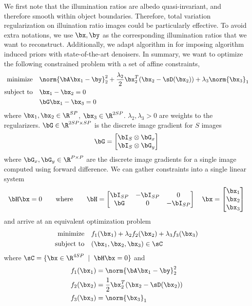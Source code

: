 \documentclass[11pt]{article}
\newcommand{\minimize}{\text{minimize}\quad}
\newcommand{\subjectto}{\text{subject to}\quad}
\begin{document}
$ $\\
We first note that the illumination ratios are albedo quasi-invariant, and therefore smooth within object boundaries. Therefore, total variation regularization on illuination ratio images could be particularly effective. To avoid extra notations, we use $\bx,\by$ as the corresponding illumination ratios that we want to reconstruct. Additionally, we adapt algorithm in \cite{romanoLittleEngineThat2016} for imposing algorithm induced priors with state-of-the-art denoisers. In summary, we want to optimize the following constrained problem with a set of affine constraints,
\begin{align*}
    \minimize  & \norm{\bA\bx_1 - \by}_2^2 + \frac{\lambda_2}{2} \bx_2^T(\bx_2 - \sD(\bx_2)) + \lambda_3 \norm{\bx_3}_1 \\
    \subjectto & \bx_1 - \bx_2 = 0 \\
               & \bG\bx_1 - \bx_3 = 0 \\
\end{align*}
where $\bx_1,\bx_2\in\R^{SP}$, $\bx_3\in\R^{2SP}$. $\lambda_2,\lambda_3>0$ are weights to the regularizers. $\bG\in \R^{2SP\times SP}$ is the discrete image gradient for $S$ images 
\[
    \bG =
    \begin{bmatrix}
        \bI_S \otimes \bG_x \\
        \bI_S \otimes \bG_y \\
    \end{bmatrix} 
\]
where $\bG_x,\bG_y\in\R^{P\times P}$ are the discrete image gradients for a single image computed using forward difference. We can gather constraints into a single linear system 
\[
    \bH\bx = 0
    \quad\quad \text{where}\quad\quad
    \bH = 
    \begin{bmatrix}
        \bI_{SP} & -\bI_{SP} & 0  \\
        \bG    & 0    & -\bI_{SP}  \\
    \end{bmatrix}
    \quad
    \bx = 
    \begin{bmatrix}
        \bx_1 \\ \bx_2 \\ \bx_3
    \end{bmatrix}
\]
and arrive at an equivalent optimization problem
\begin{equation}
    \label{eq:method_optimization_problem}
    \begin{aligned}
        \minimize  & f_1(\bx_1) + \lambda_2 f_2(\bx_2) + \lambda_3 f_3(\bx_3) \\
        \subjectto & (\bx_1,\bx_2,\bx_3) \in \sC
    \end{aligned}
\end{equation}
where $\sC = \{\bx\in\R^{4SP} \;\mid\; \bH\bx = 0\}$ and 
\begin{align*}
    f_1(\bx_1)
        &=\norm{\bA\bx_1 - \by}_2^2 \\
    f_2(\bx_2)
        &=\frac{1}{2} \bx_2^T(\bx_2 - \sD(\bx_2)) \\
    f_3(\bx_3)
        &=\norm{\bx_3}_1
\end{align*}
\end{document}
